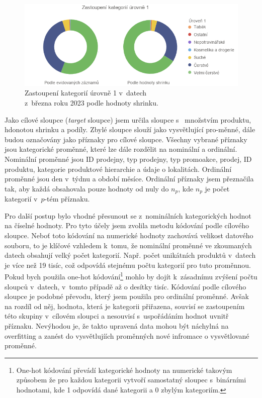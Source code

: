 \begin{figure}[h!]
    \centering
    \captionsetup{justification=centering}
    \includegraphics[width=\textwidth]{obrazky/grafy/zastoupeniL1.png}
    \caption{Zastoupení kategorií úrovně 1 v~datech \\ z~března roku 2023 podle hodnoty shrinku.}
    \label{obr:rok:g:zastoupeni1}
\end{figure}



Jako cílové sloupce (\emph{target} sloupce) jsem určila sloupce s~ množstvím produktu, hdonotou shrinku a podíly. Zbylé sloupce slouží jako vysvětlující pro-\linebreak měnné, dále budou označovány jako příznaky pro cílové sloupce. Všechny vybrané příznaky jsou kategorické proměnné, které lze dále rozdělit na nominální a ordinální. Nominální proměnné jsou ID prodejny, typ prodejny, typ promoakce, prodej, ID produktu, kategorie produktové hierarchie a údaje o lokalitách. Ordinální proměnné jsou den v~týdnu a období měsíce. Ordinální příznaky jsem přeznačila tak, aby každá obsahovala pouze hodnoty od nuly do $n_p$, kde $n_p$ je počet kategorií v~$p$-tém příznaku. 

Pro další postup bylo vhodné přesunout se z~nominálních kategorických hodnot na číselné hodnoty. Pro tyto účely jsem zvolila metodu kódování podle cílového sloupce.  %
Neboť toto kódování na numerické hodnoty zachovává velikost datového souboru, to je klíčové vzhledem k~tomu, že nominální proměnné ve zkoumaných datech obsahují velký počet kategorií. 
Např. počet unikátních produktů v~datech je více než 19 tisíc, což odpovídá stejnému počtu kategorií pro tuto proměnnou. Pokud bych použila one-hot kódování\footnote{One-hot kódování převádí kategorické hodnoty na numerické takovým způsobem že pro každou kategorii vytvoří samostatný sloupec s~binárními hodnotami, kde 1 odpovídá dané kategorii a 0 zbylým kategoriím.}  mohlo by dojít k~zásadnímu zvýšení počtu sloupců v~datech, v~tomto případě až o desítky tisíc. Kódování podle cílového sloupce je podobné převodu, který jsem použila pro ordinální proměnné. Avšak na rozdíl od něj, hodnota, která je kategorii přiřazena, souvisí se zastoupením této skupiny v~cílovém sloupci a nesouvisí s~uspořádáním hodnot uvnitř příznaku. Nevýhodou je, že takto upravená data mohou být náchylná na overfitting a zanést do vysvětlujíích proměnných nové infromace o vysvětlované proměnné. 

